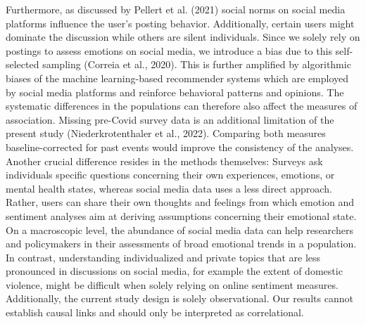 \documentclass[
  english,
  jou,floatsintext]{apa7}
\begin{document}
Furthermore, as discussed by Pellert et al. (2021) social norms on social media platforms influence the user's posting behavior. Additionally, certain users might dominate the discussion while others are silent individuals. Since we solely rely on postings to assess emotions on social media, we introduce a bias due to this self-selected sampling (Correia et al., 2020). This is further amplified by algorithmic biases of the machine learning-based recommender systems which are employed by social media platforms and reinforce behavioral patterns and opinions. The systematic differences in the populations can therefore also affect the measures of association. Missing pre-Covid survey data is an additional limitation of the present study (Niederkrotenthaler et al., 2022). Comparing both measures baseline-corrected for past events would improve the consistency of the analyses.
Another crucial difference resides in the methods themselves: Surveys ask individuals specific questions concerning their own experiences, emotions, or mental health states, whereas social media data uses a less direct approach. Rather, users can share their own thoughts and feelings from which emotion and sentiment analyses aim at deriving assumptions concerning their emotional state. On a macroscopic level, the abundance of social media data can help researchers and policymakers in their assessments of broad emotional trends in a population. In contrast, understanding individualized and private topics that are less pronounced in discussions on social media, for example the extent of domestic violence, might be difficult when solely relying on online sentiment measures. Additionally, the current study design is solely observational. Our results cannot establish causal links and should only be interpreted as correlational.
\end{document}

